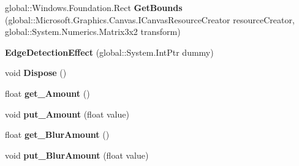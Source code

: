 \begin{DoxyCompactItemize}
global\+::\+Windows.\+Foundation.\+Rect {\bfseries Get\+Bounds} (global\+::\+Microsoft.\+Graphics.\+Canvas.\+I\+Canvas\+Resource\+Creator resource\+Creator, global\+::\+System.\+Numerics.\+Matrix3x2 transform)
\item 
\mbox{\label{class_microsoft_1_1_graphics_1_1_canvas_1_1_effects_1_1_edge_detection_effect_a9542f96d28e629e75fc7549550e42caf}} 
{\bfseries Edge\+Detection\+Effect} (global\+::\+System.\+Int\+Ptr dummy)
\item 
\mbox{\label{class_microsoft_1_1_graphics_1_1_canvas_1_1_effects_1_1_edge_detection_effect_a4ef78a65aa6c4075fd46d5020462a100}} 
void {\bfseries Dispose} ()
\item 
\mbox{\label{class_microsoft_1_1_graphics_1_1_canvas_1_1_effects_1_1_edge_detection_effect_abb9b39bb3406ac6a4e812bd40512b749}} 
float {\bfseries get\+\_\+\+Amount} ()
\item 
\mbox{\label{class_microsoft_1_1_graphics_1_1_canvas_1_1_effects_1_1_edge_detection_effect_a35679bc6700b81e40b2e61ff0a065a2e}} 
void {\bfseries put\+\_\+\+Amount} (float value)
\item 
\mbox{\label{class_microsoft_1_1_graphics_1_1_canvas_1_1_effects_1_1_edge_detection_effect_ae48b3056466454ff45406d2d9be05f6b}} 
float {\bfseries get\+\_\+\+Blur\+Amount} ()
\item 
\mbox{\label{class_microsoft_1_1_graphics_1_1_canvas_1_1_effects_1_1_edge_detection_effect_a73881826da0680e80bc3fabfb027cfd7}} 
void {\bfseries put\+\_\+\+Blur\+Amount} (float value)
\item 
\mbox{\label{class_microsoft_1_1_graphics_1_1_canvas_1_1_effects_1_1_edge_detection_effect_a6c501576c1a32800807da3e3b7750015}} 

\end{DoxyCompactItemize}
